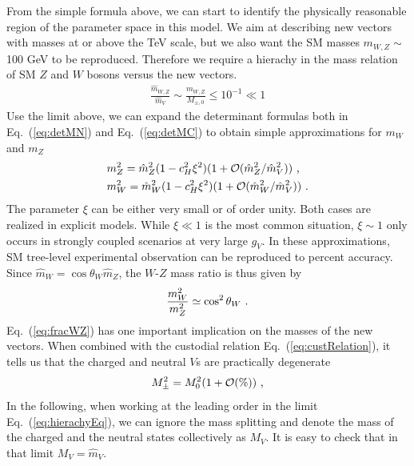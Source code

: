 From the simple formula above, we can start to identify the physically reasonable region of the parameter space in this model. We aim at describing new vectors with masses at or above the TeV scale, but we also want the SM masses $m_{W,Z} \sim$ 100 GeV to be reproduced. Therefore we require a hierachy in the mass relation of SM $Z$ and $W$ bosons versus the new vectors.
\begin{align}
  \label{eq:hierachyEq}
  \frac{\hat{m}_{W,Z}}{\hat{m}_{V}}\sim \frac{m_{W,Z}}{M_{\pm ,0}}\leq10^{-1}\ll1
\end{align}
Use the limit above, we can expand the determinant formulas both in Eq.~(\ref{eq:detMN}) and Eq.~(\ref{eq:detMC}) to obtain simple approximations for $m_{W}$ and $m_{Z}$
\begin{align}
  &m_{Z}^{2}=\hat{m}_{Z}^{2}(1-c_{H}^{2}\xi^{2})(1+\mathcal{O}(\hat{m}_{Z}^{2}/\hat{m}_{V}^{2}))\textup{ ,}\nonumber\\
  &m_{W}^{2}=\hat{m}_{W}^{2}(1-c_{H}^{2}\xi^{2})(1+\mathcal{O}(\hat{m}_{W}^{2}/\hat{m}_{V}^{2}))\textup{ .}
\end{align}
The parameter $\xi$ can be either very small or of order unity. Both cases are realized in explicit models. While $\xi\ll1$ is the most common situation, $\xi\sim1$ only occurs in strongly coupled scenarios at very large $g_{V}$. In these approximations, SM tree-level experimental observation can be reproduced to percent accuracy.
\newline Since $\hat{m}_{W}=\cos\theta_{W}\hat{m}_{Z}$, the $W$-$Z$ mass ratio is thus given by
\begin{align}
  \label{eq:fracWZ}
  \frac{m_{W}^{2}}{m_{Z}^{2}}\simeq \cos^{2}{\theta_{W}}\textup{ .}
\end{align}
Eq.~(\ref{eq:fracWZ}) has one important implication on the masses of the new vectors. When combined with the custodial relation Eq.~(\ref{eq:custRelation}), it tells us that the charged and neutral $V$s are practically degenerate
\begin{align}
  M_{\pm}^{2}=M_{0}^{2}(1+\mathcal{O}(\%))\textup{ ,}
\end{align}
In the following, when working at the leading order in the limit Eq.~(\ref{eq:hierachyEq}), we can ignore the mass splitting and denote the mass of the charged and the neutral states collectively as $M_{V}$. It is easy to check that in that limit $M_{V} = \hat{m}_{V}$.

